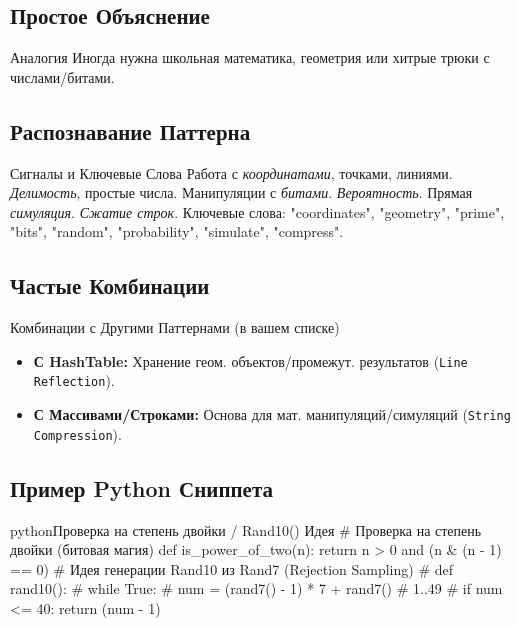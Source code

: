 \subsection{Простое Объяснение}
\begin{myblock}{Аналогия}
    Иногда нужна школьная математика, геометрия или хитрые трюки с числами/битами.
\end{myblock}

\subsection{Распознавание Паттерна}
\begin{myblock}{Сигналы и Ключевые Слова}
    Работа с \emph{координатами}, точками, линиями. \emph{Делимость}, простые числа. Манипуляции с \emph{битами}. \emph{Вероятность}. Прямая \emph{симуляция}. \emph{Сжатие строк}. \newline
    Ключевые слова: "coordinates", "geometry", "prime", "bits", "random", "probability", "simulate", "compress".
\end{myblock}

\subsection{Частые Комбинации}
\begin{myblock}{Комбинации с Другими Паттернами (в вашем списке)}
    \begin{itemize}[nosep, leftmargin=*]
        \item \textbf{С HashTable:} Хранение геом. объектов/промежут. результатов (\texttt{Line Reflection}).
        \item \textbf{С Массивами/Строками:} Основа для мат. манипуляций/симуляций (\texttt{String Compression}).
    \end{itemize}
\end{myblock}

\subsection{Пример Python Сниппета}
\begin{codebox}{python}{Проверка на степень двойки / Rand10() Идея}
# Проверка на степень двойки (битовая магия)
def is_power_of_two(n):
    return n > 0 and (n & (n - 1) == 0)
# Идея генерации Rand10 из Rand7 (Rejection Sampling)
# def rand10():
#     while True:
#         num = (rand7() - 1) * 7 + rand7() # 1..49
#         if num <= 40: return (num - 1) %
\end{codebox}

